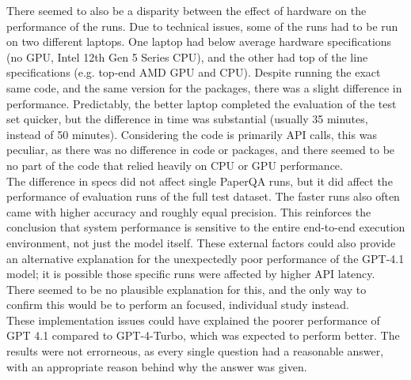 There seemed to also be a disparity between the effect of hardware on the performance of the runs. Due to technical issues, some of the runs had to be run on two different laptops. One laptop had below average hardware specifications (no GPU, Intel 12th Gen 5 Series CPU), and the other had top of the line specifications (e.g. top-end AMD GPU and CPU). Despite running the exact same code, and the same version for the packages, there was a slight difference in performance. Predictably, the better laptop completed the evaluation of the test set quicker, but the difference in time was substantial (usually 35 minutes, instead of 50 minutes). Considering the code is primarily API calls, this was peculiar, as there was no difference in code or packages, and there seemed to be no part of the code that relied heavily on CPU or GPU performance. \\

The difference in specs did not affect single PaperQA runs, but it did affect the performance of evaluation runs of the full test dataset. The faster runs also often came with higher accuracy and roughly equal precision. This reinforces the conclusion that system performance is sensitive to the entire end-to-end execution environment, not just the model itself. These external factors could also provide an alternative explanation for the unexpectedly poor performance of the GPT-4.1 model; it is possible those specific runs were affected by higher API latency. 
There seemed to be no plausible explanation for this, and the only way to confirm this would be to perform an focused, individual study instead. \\

These implementation issues could have explained the poorer performance of GPT 4.1 compared to GPT-4-Turbo, which was expected to perform better. The results were not errorneous, as every single question had a reasonable answer, with an appropriate reason behind why the answer was given.  \\


